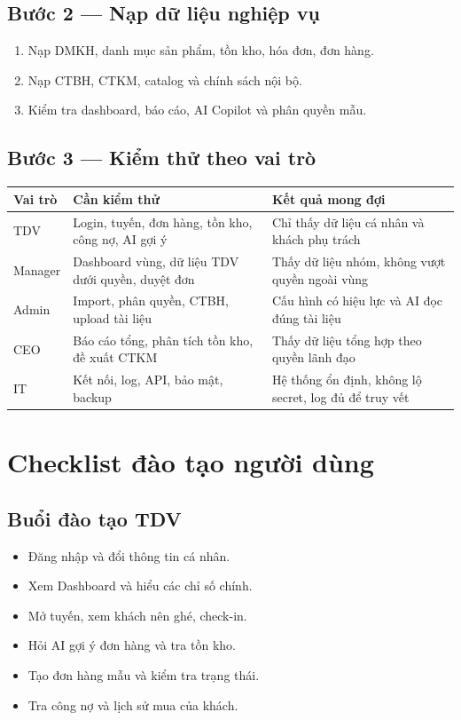 \documentclass[12pt,a4paper,oneside,openany]{book}
\newcommand{\checkbox}{\makebox[1.2em][l]{$\square$}}
\begin{document}
\section{Bước 2 — Nạp dữ liệu nghiệp vụ}
\begin{enumerate}
  \item Nạp DMKH, danh mục sản phẩm, tồn kho, hóa đơn, đơn hàng.
  \item Nạp CTBH, CTKM, catalog và chính sách nội bộ.
  \item Kiểm tra dashboard, báo cáo, AI Copilot và phân quyền mẫu.
\end{enumerate}

\section{Bước 3 — Kiểm thử theo vai trò}
\begin{longtable}{p{3cm}p{5cm}p{6cm}}
\toprule
\textbf{Vai trò} & \textbf{Cần kiểm thử} & \textbf{Kết quả mong đợi} \\
\midrule
TDV & Login, tuyến, đơn hàng, tồn kho, công nợ, AI gợi ý & Chỉ thấy dữ liệu cá nhân và khách phụ trách \\
Manager & Dashboard vùng, dữ liệu TDV dưới quyền, duyệt đơn & Thấy dữ liệu nhóm, không vượt quyền ngoài vùng \\
Admin & Import, phân quyền, CTBH, upload tài liệu & Cấu hình có hiệu lực và AI đọc đúng tài liệu \\
CEO & Báo cáo tổng, phân tích tồn kho, đề xuất CTKM & Thấy dữ liệu tổng hợp theo quyền lãnh đạo \\
IT & Kết nối, log, API, bảo mật, backup & Hệ thống ổn định, không lộ secret, log đủ để truy vết \\
\bottomrule
\end{longtable}

\chapter{Checklist đào tạo người dùng}

\section{Buổi đào tạo TDV}
\begin{itemize}
  \item \checkbox Đăng nhập và đổi thông tin cá nhân.
  \item \checkbox Xem Dashboard và hiểu các chỉ số chính.
  \item \checkbox Mở tuyến, xem khách nên ghé, check-in.
  \item \checkbox Hỏi AI gợi ý đơn hàng và tra tồn kho.
  \item \checkbox Tạo đơn hàng mẫu và kiểm tra trạng thái.
  \item \checkbox Tra công nợ và lịch sử mua của khách.
\end{itemize}
\end{document}
